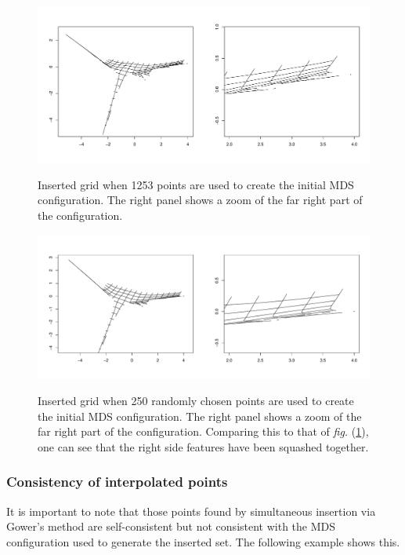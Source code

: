 \documentclass[a4paper,10pt]{article}
\newcommand{\fig}[1]{\emph{fig.} (\ref{#1})}
\begin{document}
\begin{figure}
\centering
\includegraphics[width=5in]{figs/wt2-grid-full.pdf} \\
\caption{Inserted grid when 1253 points are used to create the initial MDS configuration. The right panel shows a zoom of the far right part of the configuration.}
\label{wt2-grid-full}
\end{figure}

\begin{figure}
\centering
\includegraphics[width=5in]{figs/wt2-grid-samp.pdf} \\
\caption{Inserted grid when 250 randomly chosen points are used to create the initial MDS configuration. The right panel shows a zoom of the far right part of the configuration. Comparing this to that of \fig{wt2-grid-full}, one can see that the right side features have been squashed together.}
\label{wt2-grid-samp}
\end{figure}


\subsubsection{Consistency of interpolated points}

It is important to note that those points found by simultaneous insertion via Gower's method are self-consistent but not consistent with the MDS configuration used to generate the inserted set. The following example shows this.
\end{document}
